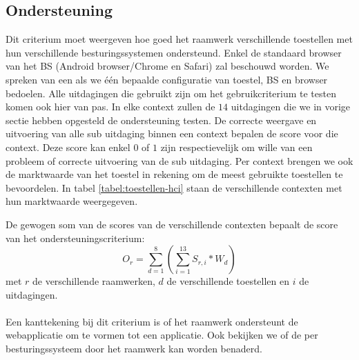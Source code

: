 \subsection{Ondersteuning}
\label{sec:vergelijking-ondersteuning}
Dit criterium moet weergeven hoe goed het raamwerk verschillende toestellen met hun verschillende besturingssystemen ondersteund.
Enkel de standaard browser van het BS (Android browser/Chrome en Safari) zal beschouwd worden.
We spreken van een  als we één bepaalde configuratie van toestel, BS en browser bedoelen.
Alle uitdagingen die gebruikt zijn om het gebruikcriterium te testen komen ook hier van pas.
In elke context zullen de $14$ uitdagingen die we in vorige sectie hebben opgesteld de ondersteuning testen.
De correcte weergave en uitvoering van alle sub uitdaging binnen een context bepalen de score voor die context.
Deze score kan enkel $0$ of $1$ zijn respectievelijk om wille van een probleem of correcte uitvoering van de sub uitdaging.
Per context brengen we ook de marktwaarde van het toestel in rekening om de meest gebruikte toestellen te bevoordelen.
In tabel \ref{tabel:toestellen-hci} staan de verschillende contexten met hun marktwaarde weergegeven.

De gewogen som van de scores van de verschillende contexten bepaalt de score van het ondersteuningscriterium:
\begin{equation}
  O_r = \sum_{d=1}^{8}{\left(\sum_{i=1}^{13}S_{r,i}*W_d\right)}
  \label{eq:ondersteuning}
\end{equation}
met $r$ de verschillende raamwerken,  $d$ de verschillende toestellen en $i$ de uitdagingen. 
\paragraph{}
Een kanttekening bij dit criterium is of het raamwerk ondersteunt de webapplicatie om te vormen tot een  applicatie. 
Ook bekijken we of de  per besturingssysteem door het raamwerk kan worden benaderd.

